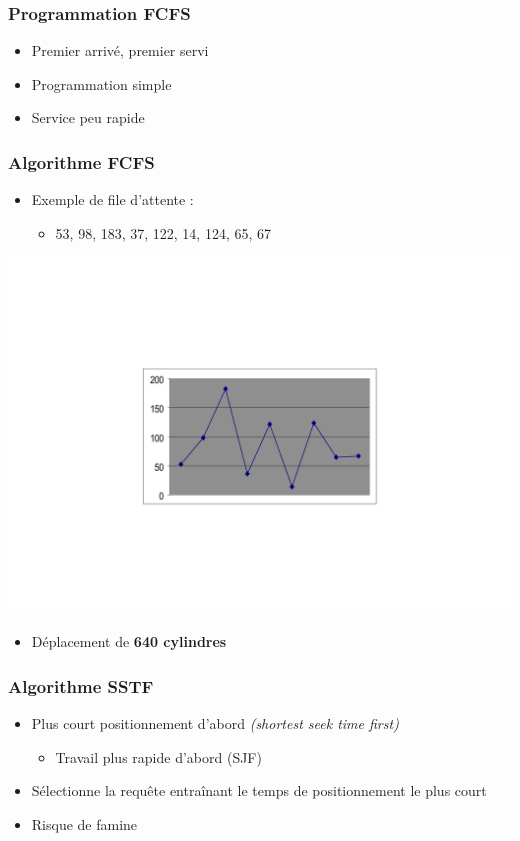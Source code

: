 \begin{frame}
\frametitle{Programmation FCFS}
\begin{itemize}
\item Premier arrivé, premier servi
\item Programmation simple
\item Service peu rapide
\end{itemize}
\end{frame}

\begin{frame}
\frametitle{Algorithme FCFS}
\begin{itemize}
\item Exemple de file d'attente :
\begin{itemize}
\item 53, 98, 183, 37, 122, 14, 124, 65, 67
\end{itemize}
\end{itemize}
\begin{flushright}
\includegraphics[width=.6\textwidth]{../illustration/prog_disque_fcfs.pdf}
\end{flushright}
\begin{itemize}
\item Déplacement de \textbf{640 cylindres}
\end{itemize}
\end{frame}

\begin{frame}
\frametitle{Algorithme SSTF}
\begin{itemize}
\item Plus court positionnement d'abord \textit{(shortest seek time first)}
\begin{itemize}
\item Travail plus rapide d'abord (SJF)
\end{itemize}
\item Sélectionne la requête entraînant le temps de positionnement le plus court

\item Risque de famine
\end{itemize}
\end{frame}

